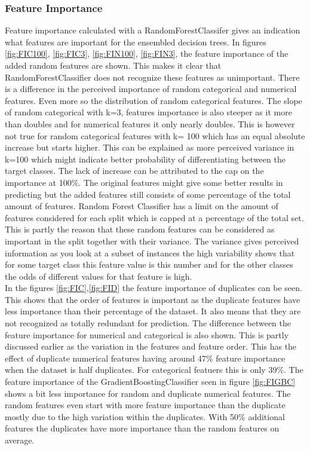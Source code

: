 \documentclass[a4paper,10pt]{article}
\begin{document}
\subsubsection{Feature Importance}\label{chapter312}
Feature importance calculated with a RandomForestClassifer gives an indication what features are important for the ensembled decision trees. In figures \ref{fig:FIC100}, \ref{fig:FIC3}, \ref{fig:FIN100}, \ref{fig:FIN3}, the feature importance of the added random features are shown. This makes it clear that RandomForestClassifier does not recognize these features as unimportant. There is a difference in the perceived importance of random categorical and numerical features. Even more so the distribution of random categorical features. The slope of random categorical with k=3, features importance is also steeper as it more than doubles and for numerical features it only nearly doubles. This is however not true for random categorical features with k= 100 which has an equal absolute increase but starts higher. This can be explained as more perceived variance in k=100 which might indicate better probability of differentiating between the target classes. The lack of increase can be attributed to the cap on the importance at 100$\%$. The original features might give some better results in predicting but the added features still consists of some percentage of the total amount of features. Random Forest Classifier has a limit on the amount of features considered for each split which is capped at a percentage of the total set. This is partly the reason that these random features can be considered as important in the split together with their variance. The variance gives perceived information as you look at a subset of instances the high variability shows that for some target class this feature value is this number and for the other classes the odds of different values for that feature is high. 
\\

In the figures \ref{fig:FIC},\ref{fig:FID} the feature importance of duplicates can be seen. This shows that the order of features is important as the duplicate features have less importance than their percentage of the dataset. It also means that they are not recognized as totally redundant for prediction. The difference between the feature importance for numerical and categorical is also shown. This is partly discussed earlier as the variation in the features and feature order. This has the effect of duplicate numerical features having around 47$\%$ feature importance when the dataset is half duplicates. For categorical featuers this is only 39$\%$. The feature importance of the GradientBoostingClassifier seen in figure \ref{fig:FIGBC} shows a bit less importance for random and duplicate numerical features. The random features even start with more feature importance than the duplicate mostly due to the high variation within the duplicates. With 50$\%$ additional features the duplicates have more importance than the random features on average. 
\end{document}
